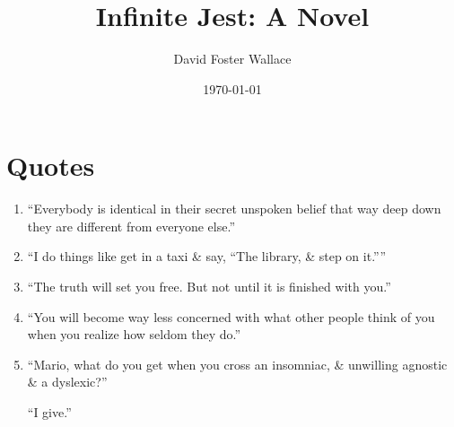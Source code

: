 \documentclass{article}
\title{Infinite Jest: A Novel}
\author{David Foster Wallace}
\date{\today}
\numberwithin{equation}{section}
\begin{document}
\maketitle
\tableofcontents


\section{Quotes}

\begin{enumerate}
	\item ``Everybody is identical in their secret unspoken belief that way deep down they are different from everyone else.''
	\item ``I do things like get in a taxi \& say, ``The library, \& step on it.''''
	\item ``The truth will set you free. But not until it is finished with you.''
	\item ``You will become way less concerned with what other people think of you when you realize how seldom they do.''
	\item ``Mario, what do you get when you cross an insomniac, \& unwilling agnostic \& a dyslexic?''
	
	``I give.''
	

\end{enumerate}
\end{document}

